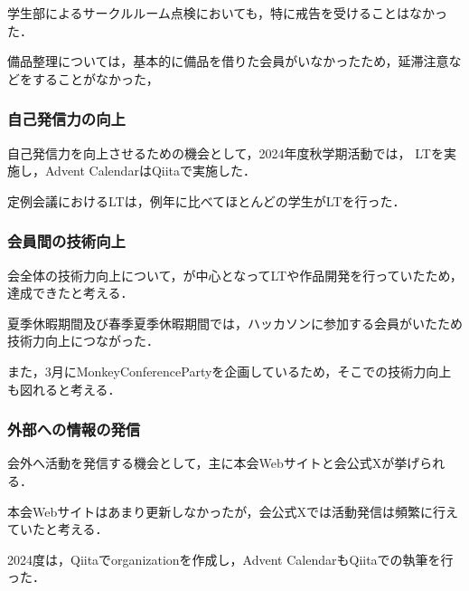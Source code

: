     学生部によるサークルルーム点検においても，特に戒告を受けることはなかった．


    備品整理については，基本的に備品を借りた会員がいなかったため，延滞注意などをすることがなかった，


\subsubsection*{自己発信力の向上}
    自己発信力を向上させるための機会として，2024年度秋学期活動では，
    LTを実施し，Advent CalendarはQiitaで実施した．

    定例会議におけるLTは，例年に比べてほとんどの学生がLTを行った．

\subsubsection*{会員間の技術向上}
    会全体の技術力向上について，\firstGrade{}が中心となってLTや作品開発を行っていたため，達成できたと考える．

    夏季休暇期間及び春季夏季休暇期間では，ハッカソンに参加する会員がいたため技術力向上につながった．

    また，3月にMonkeyConferencePartyを企画しているため，そこでの技術力向上も図れると考える．

\subsubsection*{外部への情報の発信}
    会外へ活動を発信する機会として，主に本会Webサイトと会公式Xが挙げられる．

    本会Webサイトはあまり更新しなかったが，会公式Xでは活動発信は頻繁に行えていたと考える．

    2024度は，Qiitaでorganizationを作成し，Advent CalendarもQiitaでの執筆を行った．

